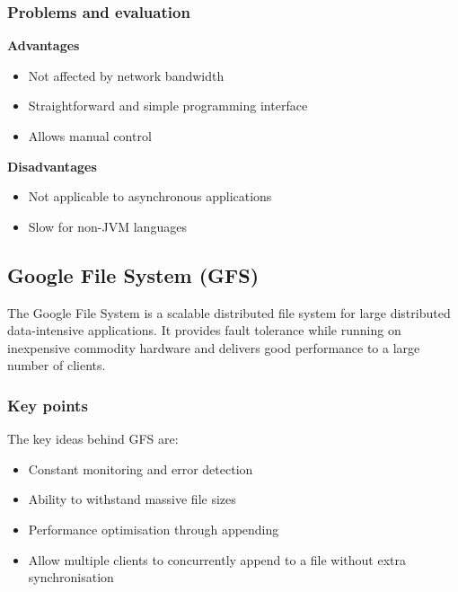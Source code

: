 \documentclass{sty/SizheArticle}
\begin{document}




\subsubsection{Problems and evaluation}
\textbf{Advantages}
\begin{itemize}
\item Not affected by network bandwidth
\item Straightforward and simple programming interface
\item Allows manual control
\end{itemize}

\textbf{Disadvantages}
\begin{itemize}
\item Not applicable to asynchronous applications
\item Slow for non-JVM languages
\end{itemize}
\subsection{Google File System (GFS)}
The Google File System is a scalable distributed file system for large
distributed data-intensive applications. It provides fault tolerance while
running on inexpensive commodity hardware and delivers good performance to a
large number of clients.

\subsubsection{Key points}
The key ideas behind GFS are:
\begin{itemize}
\item Constant monitoring and error detection
\item Ability to withstand massive file sizes
\item Performance optimisation through appending
\item Allow multiple clients to concurrently append to a file without
extra synchronisation
\end{itemize}
\end{document}
